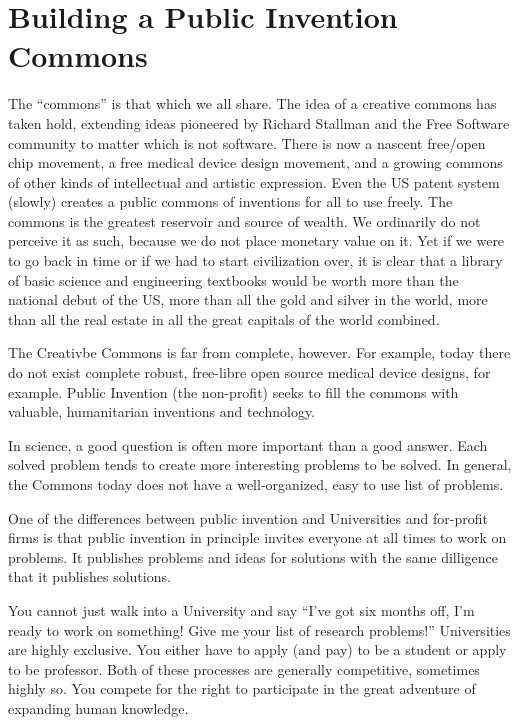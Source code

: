 \documentclass[
	fontsize=10pt, %
	twoside=false, %
	secnumdepth=1, %
]{kaobook}
\begin{document}
\chapter{Building a Public Invention Commons}

The ``commons'' is that which we all share.
The idea of a creative commons has taken hold,
extending ideas pioneered by Richard Stallman and
the Free Software community to matter which is not
software.
There is now a nascent free/open chip
movement, a free medical device design movement, and a growing
commons of other kinds of intellectual and artistic
expression.
Even the US patent system (slowly) creates
a public commons of inventions for all to use freely.
The commons is the greatest reservoir and source of
wealth.
We ordinarily do not perceive it as such, because
we do not place monetary value on it.
Yet if we were to go back in time or if we
had to start civilization over, it is clear that
a library of basic science and engineering textbooks
would be worth more than the national debut of the US,
more than all the gold and silver in the world, more
than all the real estate in all the great capitals
of the world combined.

The Creativbe Commons is far from complete, however. For example,
today there do not exist complete robust, free-libre
open source medical device designs, for example.
Public Invention (the non-profit) seeks to fill the commons with
valuable, humanitarian inventions and technology.

In science, a good question is often more important
than a good answer. Each solved problem tends to create
more interesting problems to be solved.
In general, the Commons today does not have
a well-organized, easy to use list of problems.

One of the differences between public invention and
Universities and for-profit firms is that public invention in principle
invites everyone at all times to work on problems.
It publishes problems and ideas for solutions with the same
dilligence that it publishes solutions.

You cannot just walk into a University and say ``I've got
six months off, I'm ready to work on something! Give me
your list of research problems!''
Universities are highly exclusive.
You either have to apply (and pay) to be a student or
apply to be professor.
Both of these processes are
generally competitive, sometimes highly so.
You compete for the right to
participate in the great adventure of expanding
human knowledge.
\end{document}
